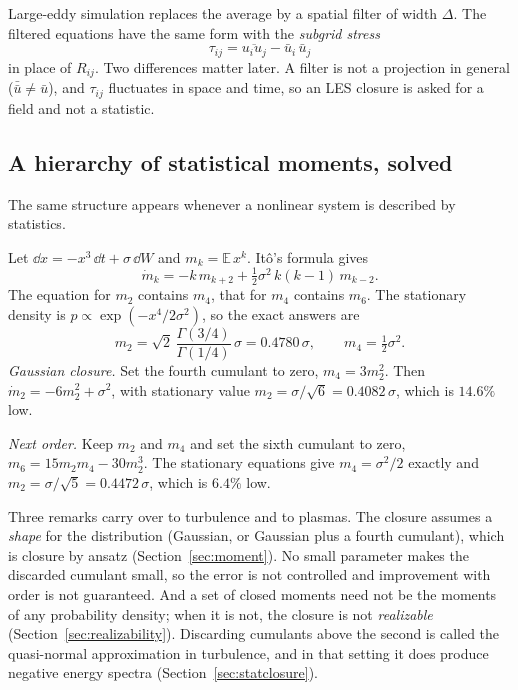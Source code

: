 Large-eddy simulation replaces the average by a spatial filter of width
$\Delta$. The filtered equations have the same form with the
\emph{subgrid stress}
\begin{equation}
  \tau_{ij} = \overline{u_iu_j}-\bar u_i\,\bar u_j
  \label{eq:sgs}
\end{equation}
in place of $R_{ij}$. Two differences matter later. A filter is not a
projection in general ($\bar{\bar u}\ne\bar u$), and $\tau_{ij}$ fluctuates
in space and time, so an LES closure is asked for a field and not a
statistic.

\subsection{A hierarchy of statistical moments, solved}
\label{sec:langevin}

The same structure appears whenever a nonlinear system is described by
statistics.

\begin{example}
\label{ex:langevin}
Let $\dd x=-x^3\,\dd t+\sigma\,\dd W$ and $m_k=\mathbb E\,x^k$. It\^o's
formula gives
\begin{equation}
  \dot m_k = -k\,m_{k+2} + \tfrac12\sigma^2\,k(k-1)\,m_{k-2} .
\end{equation}
The equation for $m_2$ contains $m_4$, that for $m_4$ contains $m_6$. The
stationary density is $p\propto\exp(-x^4/2\sigma^2)$, so the exact answers
are
\[
  m_2=\sqrt2\,\frac{\Gamma(3/4)}{\Gamma(1/4)}\,\sigma = 0.4780\,\sigma,
  \qquad m_4=\tfrac12\sigma^2 .
\]
\emph{Gaussian closure.} Set the fourth cumulant to zero, $m_4=3m_2^2$.
Then $\dot m_2=-6m_2^2+\sigma^2$, with stationary value
$m_2=\sigma/\sqrt6=0.4082\,\sigma$, which is $14.6\%$ low.

\emph{Next order.} Keep $m_2$ and $m_4$ and set the sixth cumulant to
zero, $m_6=15m_2m_4-30m_2^3$. The stationary equations give
$m_4=\sigma^2/2$ exactly and $m_2=\sigma/\sqrt5=0.4472\,\sigma$, which is
$6.4\%$ low.
\end{example}

Three remarks carry over to turbulence and to plasmas. The closure assumes
a \emph{shape} for the distribution (Gaussian, or Gaussian plus a fourth
cumulant), which is closure by ansatz (Section~\ref{sec:moment}). No small
parameter makes the discarded cumulant small, so the error is not
controlled and improvement with order is not guaranteed. And a set of
closed moments need not be the moments of any probability density; when it
is not, the closure is not \emph{realizable} (Section~\ref{sec:realizability}).
Discarding cumulants above the second is called the quasi-normal
approximation in turbulence, and in that setting it does produce negative
energy spectra (Section~\ref{sec:statclosure}).

